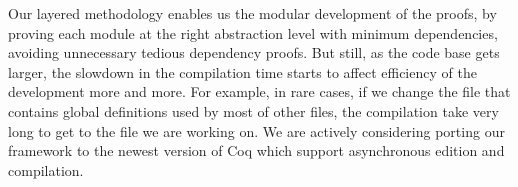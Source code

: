 Our layered methodology enables us the modular development of the proofs, by proving
each module at the right abstraction level with minimum dependencies, avoiding unnecessary
tedious dependency proofs. But still, as the code base gets larger, the slowdown
in the compilation time starts to affect efficiency of the development more and more.
For example, in rare cases, if we change the file that contains global definitions used by
most of other files, the compilation take very long to get to the file we are working on.
We are actively considering porting our framework to the newest version of Coq which support
asynchronous edition and compilation.
